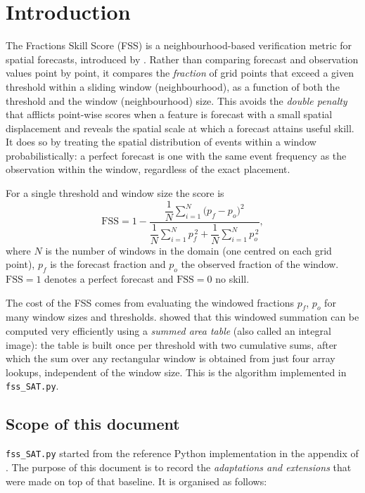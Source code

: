 \section{Introduction}

The Fractions Skill Score (FSS) is a neighbourhood-based verification metric
for spatial forecasts, introduced by \citet{roberts2008}. Rather than comparing
forecast and observation values point by point, it compares the \emph{fraction}
of grid points that exceed a given threshold within a sliding window
(neighbourhood), as a function of both the threshold and the window
(neighbourhood) size. This avoids the \emph{double penalty} that afflicts
point-wise scores when a feature is forecast with a small spatial displacement
and reveals the spatial scale at which a forecast attains useful skill. It does
so by treating the spatial distribution of events within a window
probabilistically: a perfect forecast is one with the same event frequency as
the observation within the window, regardless of the exact placement.

For a single threshold and window size the score is \citep{roberts2008}
%
\begin{equation}
  \mathrm{FSS} = 1 -
  \frac{\dfrac{1}{N}\displaystyle\sum_{i=1}^{N}\bigl(p_f - p_o\bigr)^2}
       {\dfrac{1}{N}\displaystyle\sum_{i=1}^{N}p_f^{\,2}
        + \dfrac{1}{N}\displaystyle\sum_{i=1}^{N}p_o^{\,2}},
  \label{eq:fss}
\end{equation}
%
where $N$ is the number of windows in the domain (one centred on each grid
point), $p_f$ is the forecast fraction and $p_o$ the observed fraction of the
window. $\mathrm{FSS}=1$ denotes a perfect forecast and $\mathrm{FSS}=0$ no
skill.

The cost of the FSS comes from evaluating the windowed fractions $p_f$, $p_o$
for many window sizes and thresholds. \citet{faggian2015} showed that this
windowed summation can be computed very efficiently using a \emph{summed area
table} (also called an integral image): the table is built once per threshold
with two cumulative sums, after which the sum over any rectangular window is
obtained from just four array lookups, independent of the window size. This is
the algorithm implemented in \texttt{fss\_SAT.py}.

\subsection{Scope of this document}

\texttt{fss\_SAT.py} started from the reference Python implementation in the
appendix of \citet{faggian2015}. The purpose of this document is to record the
\emph{adaptations and extensions} that were made on top of that baseline. It is
organised as follows:

